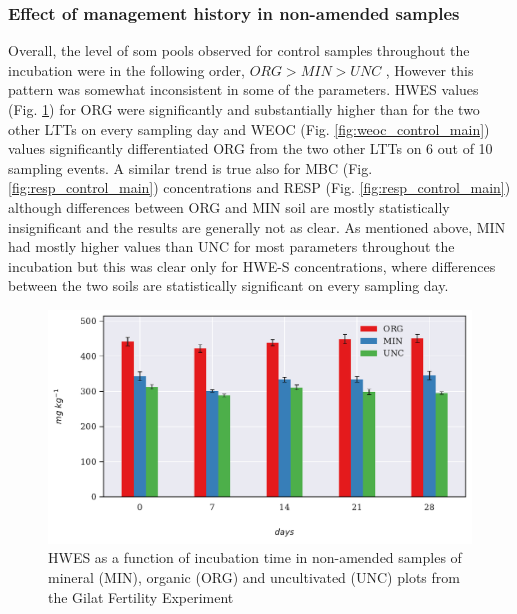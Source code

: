		\subsubsection{Effect of management history in non-amended samples}

			Overall, the level of \gls{som} pools observed for control samples throughout the incubation were in the following order, $ ORG  >  MIN  >  UNC $  , However this pattern was somewhat inconsistent in some of the parameters. HWES values (Fig. \ref{fig:hwes_control_main}) for ORG were significantly and substantially higher than for the two other LTTs on every sampling day and WEOC (Fig. \ref{fig:weoc_control_main}) values significantly differentiated ORG from the two other LTTs on 6 out of 10 sampling events. A similar trend is true also for MBC (Fig. \ref{fig:resp_control_main}) concentrations and RESP (Fig. \ref{fig:resp_control_main}) although differences between ORG and MIN soil  are mostly statistically insignificant and the results are generally not as clear. As mentioned above, MIN had mostly higher values than UNC for most parameters throughout the incubation but this was clear only for HWE-S concentrations, where differences between the two soils are statistically significant on every sampling day.

			\begin{figure}[H]
				\centering
				\includegraphics[scale=0.8, width=\linewidth]{thesis_figures/main_incubation/control/HWES.pdf}
				\caption{HWES as a function of incubation time in non-amended samples of mineral (MIN), organic (ORG) and uncultivated (UNC) plots from the Gilat Fertility Experiment}
				\label{fig:hwes_control_main}
			\end{figure}

